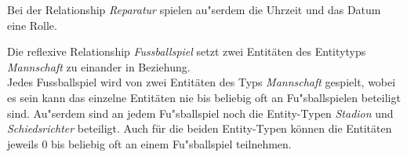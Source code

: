 \documentclass[ngerman]{gdb-aufgabenblatt}
\begin{document}
\begin{compactenum}[(a)]
	Bei der Relationship \textit{Reparatur} spielen au"serdem die Uhrzeit und das Datum eine Rolle. \\
	\item Die reflexive Relationship \textit{Fussballspiel} setzt zwei Entit\"aten des Entitytyps \textit{Mannschaft} zu einander in Beziehung.\\
	Jedes Fussballspiel wird von zwei Entit\"aten des Typs \textit{Mannschaft} gespielt, wobei es sein kann das einzelne Entit\"aten nie bis beliebig oft an Fu"sballspielen beteiligt sind. Au"serdem sind an jedem Fu"sballspiel noch die Entity-Typen \textit{Stadion} und \textit{Schiedsrichter} beteiligt. Auch f\"ur die beiden Entity-Typen k\"onnen die Entit\"aten jeweils 0 bis beliebig oft an einem Fu"sballspiel teilnehmen.\\
	 
\end {compactenum}
\end{document}
